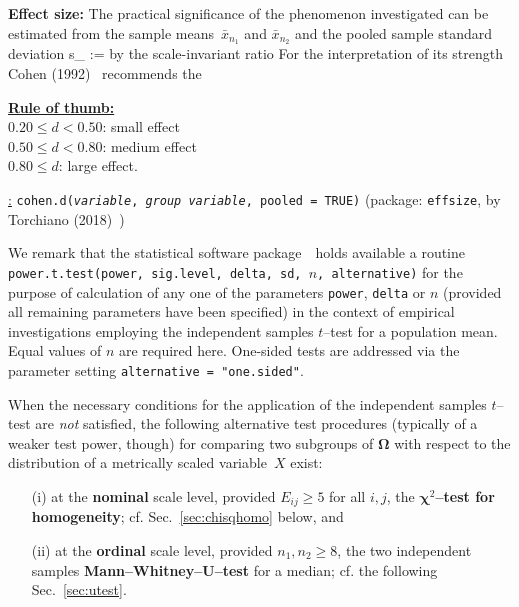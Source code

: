\medskip
\noindent
\textbf{Effect size:} The practical significance of the phenomenon investigated can be estimated from the sample
means~$\bar{x}_{n_{1}}$ and $\bar{x}_{n_{2}}$ and the pooled sample
standard deviation
%
\be
s_{} := 
\ee
%
by the scale-invariant ratio
%
\be
{}
\ee
%
For the interpretation of its strength Cohen 
(1992)~ recommends the

\medskip
\noindent
\underline{\textbf{Rule of thumb:}}\\
$0.20 \leq d < 0.50$: small effect\\
$0.50 \leq d < 0.80$: medium effect\\
$0.80 \leq d$: large effect.

\medskip
\noindent
\underline{\R:}
\texttt{cohen.d(\textit{variable}, \textit{group
variable}, pooled = TRUE)} (package: \texttt{effsize}, by
Torchiano (2018)~)

\medskip
\noindent
We remark that the statistical software package~\R\ holds 
available a routine \texttt{power.t.test(power, sig.level, delta,
sd, $n$, alternative)} for the purpose of calculation of any one 
of the parameters \texttt{power}, \texttt{delta} or $n$ (provided 
all remaining parameters have been specified) in the context of 
empirical investigations employing the independent samples 
$t$--test for a population mean. Equal values of $n$ are 
required here. One-sided tests are addressed via the parameter 
setting \texttt{alternative = "one.sided"}.

\medskip
\noindent
When the necessary conditions for the application of the
independent samples $t$--test are \textit{not} satisfied, the 
following alternative test procedures (typically of a weaker test 
power, though) for comparing two subgroups of 
$\boldsymbol{\Omega}$ with respect to the distribution of a 
metrically scaled variable~$X$ exist:
%
\begin{itemize}
\item[(i)] at the \textbf{nominal} scale level, provided $E_{ij}
\geq 5$ for all $i,j$, the \textbf{$\boldsymbol{\chi}^{2}$--test
for homogeneity}; cf.  Sec.~\ref{sec:chisqhomo} below, and
\item[(ii)] at the \textbf{ordinal} scale level, provided $n_{1}, 
n_{2} \geq 8$, the two independent samples 
\textbf{Mann--Whitney--$\boldsymbol{U}$--test} for a  median; cf. 
the following Sec.~\ref{sec:utest}.
\end{itemize}
%

